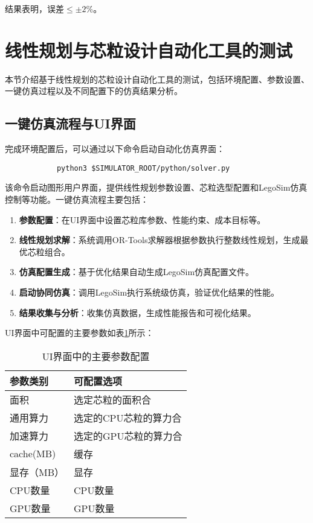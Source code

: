 \documentclass[bachelor]{thesis-uestc}
\begin{document}
结果表明，误差$\leq\pm2\%$。


\section{线性规划与芯粒设计自动化工具的测试}

本节介绍基于线性规划的芯粒设计自动化工具的测试，包括环境配置、参数设置、一键仿真过程以及不同配置下的仿真结果分析。

\subsection{一键仿真流程与UI界面}

完成环境配置后，可以通过以下命令启动自动化仿真界面：

\begin{verbatim}
            python3 $SIMULATOR_ROOT/python/solver.py
\end{verbatim}

该命令启动图形用户界面，提供线性规划参数设置、芯粒选型配置和LegoSim仿真控制等功能。一键仿真流程主要包括：

\begin{enumerate}
    \item \textbf{参数配置}：在UI界面中设置芯粒库参数、性能约束、成本目标等。
    \item \textbf{线性规划求解}：系统调用OR-Tools求解器根据参数执行整数线性规划，生成最优芯粒组合。
    \item \textbf{仿真配置生成}：基于优化结果自动生成LegoSim仿真配置文件。
    \item \textbf{启动协同仿真}：调用LegoSim执行系统级仿真，验证优化结果的性能。
    \item \textbf{结果收集与分析}：收集仿真数据，生成性能报告和可视化结果。
\end{enumerate}

UI界面中可配置的主要参数如表\ref{tab:ui_parameters}所示：

\begin{table}[htbp]
\caption{UI界面中的主要参数配置}
\centering
\begin{tabular}{|l|p{10cm}|}
\hline
\textbf{参数类别} & \textbf{可配置选项} \\
\hline
面积 & 选定芯粒的面积合 \\
\hline
通用算力 & 选定的CPU芯粒的算力合 \\
\hline
加速算力 & 选定的GPU芯粒的算力合 \\
\hline
cache(MB) & 缓存 \\
\hline
显存（MB） & 显存 \\
\hline
CPU数量 & CPU数量 \\
\hline
GPU数量 & GPU数量 \\
\hline
\end{tabular}
\label{tab:ui_parameters}
\end{table}
\end{document}
